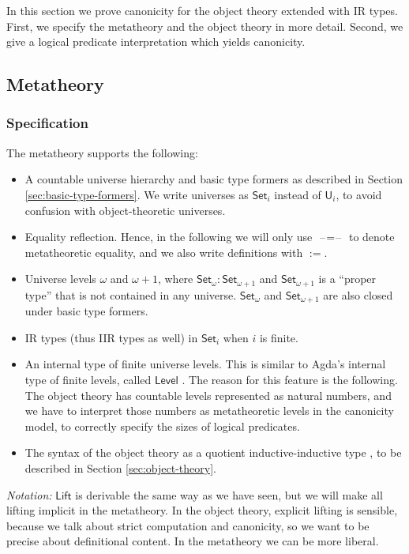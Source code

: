 \documentclass[acmsmall,screen,review]{acmart}
\newcommand{\msf}[1]{{\mathsf{#1}}}
\newcommand{\U}{\msf{U}}
\newcommand{\Set}{\msf{Set}}
\newcommand{\Lift}{\msf{Lift}}
\newcommand{\blank}{{\mathord{\hspace{1pt}\text{--}\hspace{1pt}}}}
\newcommand{\Level}{\msf{Level}}
\begin{document}
In this section we prove canonicity for the object theory extended with IR types. First, we specify
the metatheory and the object theory in more detail. Second, we give a logical predicate
interpretation which yields canonicity.

\subsection{Metatheory}\label{sec:metatheory}

\subsubsection{Specification} The metatheory supports the following:
\begin{itemize}
  \item A countable universe hierarchy and basic type formers as described in Section \ref{sec:basic-type-formers}.
    We write universes as $\Set_i$ instead of $\U_i$, to avoid confusion with object-theoretic
    universes.
  \item Equality reflection. Hence, in the following we will only use $\blank\!=\!\blank$ to denote
    metatheoretic equality, and we also write definitions with $:=$.
  \item Universe levels $\omega$ and $\omega+1$, where $\Set_\omega : \Set_{\omega + 1}$ and $\Set_{\omega + 1}$
        is a ``proper type'' that is not contained in any universe. $\Set_\omega$ and $\Set_{\omega + 1}$ are
        also closed under basic type formers.
  \item IR types (thus IIR types as well) in $\Set_i$ when $i$ is finite.
  \item An internal type of finite universe levels. This is similar to Agda's internal type of
    finite levels, called $\Level$ \cite{agdadocs}. The reason for this feature is the following. The
    object theory has countable levels represented as natural numbers, and we have to interpret
    those numbers as metatheoretic levels in the canonicity model, to correctly specify the sizes of
    logical predicates.
  \item The syntax of the object theory as a quotient inductive-inductive type \cite{ttintt,DBLP:journals/corr/abs-2302-08837}, to be
    described in Section \ref{sec:object-theory}.
\end{itemize}
\emph{Notation:} $\Lift$ is derivable the same way as we have seen, but we will make all
lifting implicit in the metatheory. In the object theory, explicit lifting is sensible, because
we talk about strict computation and canonicity, so we want to be precise about definitional
content. In the metatheory we can be more liberal.
\end{document}
